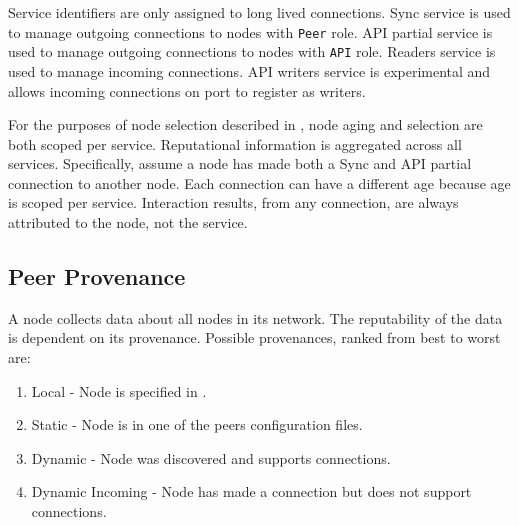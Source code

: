 Service identifiers are only assigned to long lived connections.
Sync service is used to manage outgoing connections to nodes with \texttt{Peer} role.
API partial service is used to manage outgoing connections to nodes with \texttt{API} role.
Readers service is used to manage incoming connections.
API writers service is experimental and allows incoming connections on port  to register as writers.

\begin{figure}[H]
	\label{tbl:network:serviceIdentifiers}
\end{figure}

For the purposes of node selection described in , node aging and selection are both scoped per service.
Reputational information is aggregated across all services.
Specifically, assume a node has made both a Sync and API partial connection to another node.
Each connection can have a different age because age is scoped per service.
Interaction results, from any connection, are always attributed to the node, not the service.

\subsection{Peer Provenance}

A node collects data about all nodes in its network.
The reputability of the data is dependent on its provenance.
Possible provenances, ranked from best to worst are:
\begin{enumerate}
	\item{Local - Node is specified in .}
	\item{Static - Node is in one of the peers configuration files.}
	\item{Dynamic - Node was discovered and supports connections.}
	\item{Dynamic Incoming - Node has made a connection but does not support connections.}
\end{enumerate}

